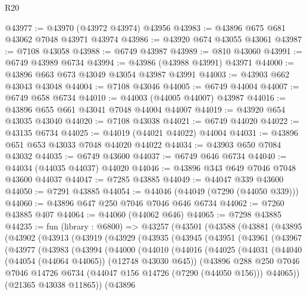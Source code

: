 \begin{lexlean}{R20}
\begin{coremodule}
{@43977 := @43970 (@43972 @43974) @43956
@43983 := @43896 @675 @681 @43062 @7048 @43971 @43974
@43986 := @43920 @674 @43055 @43061
@43987 := @7108 @43058
@43988 := @6749 @43987
@43989 := @810 @43060
@43991 := @6749 @43989 @6734
@43994 := @43986 (@43988 @43991) @43971
@44000 := @43896 @663 @673 @43049 @43054 @43987 @43991
@44003 := @43903 @662 @43043 @43048
@44004 := @7108 @43046
@44005 := @6749 @44004
@44007 := @6749 @658 @6734
@44010 := @44003 (@44005 @44007) @43987
@44016 := @43896 @655 @661 @43041 @7048 @44004 @44007
@44019 := @43920 @654 @43035 @43040
@44020 := @7108 @43038
@44021 := @6749 @44020
@44022 := @43135 @6734
@44025 := @44019 (@44021 @44022) @44004
@44031 := @43896 @651 @653 @43033 @7048 @44020 @44022
@44034 := @43903 @650 @7084 @43032
@44035 := @6749 @43600
@44037 := @6749 @646 @6734
@44040 := @44034 (@44035 @44037) @44020
@44046 := @43896 @343 @649 @7046 @7048 @43600 @44037
@44047 := @7285 @43885
@44049 := @44047 @339 @43600
@44050 := @7291 @43885
@44054 := @44046 (@44049 (@7290 (@44050 @339)))
@44060 := @43896 @647 @250 @7046 @7046 @646 @6734
@44062 := @7260 @43885 @407
@44064 := @44060 (@44062 @646)
@44065 := @7298 @43885
@44235 := fun (library : @6800) =>
  @43257
    (@43501
      (@43588
        (@43881
          (@43895
            (@43902
              (@43913
                (@43919
                  (@43929
                    (@43935
                      (@43945
                        (@43951
                          (@43961
                            (@43967
                              (@43977
                                (@43983
                                  (@43994
                                    (@44000
                                      (@44010
                                        (@44016
                                          (@44025
                                            (@44031
                                              (@44040 (@44054 (@44064 @44065)) (@12748 @43030 @645))
                                              (@43896
                                                @288
                                                @250
                                                @7046
                                                @7046
                                                @14726
                                                @6734
                                                (@44047 @156 @14726 (@7290 (@44050 @156)))
                                                @44065))
                                            (@21365 @43038 @11865))
                                          (@43896
}
\end{coremodule}
\end{lexlean}
